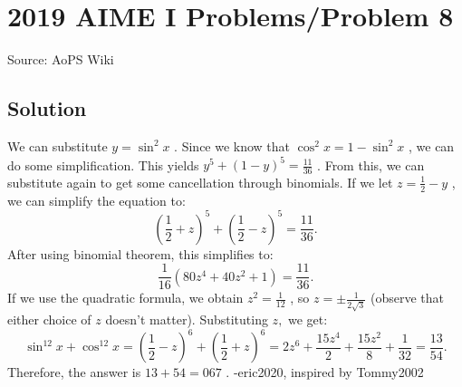 \documentclass[12pt]{article}
\begin{document}
\section*{{2019 AIME I Problems/Problem 8}}
Source: AoPS Wiki

\subsection*{Solution}
We can substitute $y = \sin^2{x}$ . Since we know that $\cos^2{x}=1-\sin^2{x}$ , we can do some simplification. This yields $y^5+(1-y)^5=\frac{11}{36}$ . From this, we can substitute again to get some cancellation through binomials. If we let $z=\frac{1}{2}-y$ , we can simplify the equation to: \[\left(\frac{1}{2}+z\right)^5+\left(\frac{1}{2}-z\right)^5=\frac{11}{36}.\] After using binomial theorem, this simplifies to: \[\frac{1}{16}(80z^4+40z^2+1)=\frac{11}{36}.\] If we use the quadratic formula, we obtain $z^2=\frac{1}{12}$ , so $z=\pm\frac{1}{2\sqrt{3}}$ (observe that either choice of $z$ doesn't matter). Substituting $z,$ we get: \[\sin^{12}{x}+\cos^{12}{x}=\left(\frac{1}{2}-z\right)^6+\left(\frac{1}{2}+z\right)^6=2z^6 + \frac{15z^4}{2} + \frac{15z^2}{8} + \frac{1}{32}=\frac{13}{54}.\] Therefore, the answer is $13+54=\boxed{067}$ . -eric2020, inspired by Tommy2002
\end{document}
